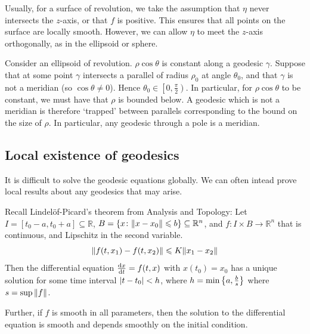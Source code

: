 \documentclass[a4paper]{article}
\begin{document}
\begin{example}
	Usually, for a surface of revolution, we take the assumption that \( \eta \) never intersects the \( z \)-axis, or that \( f \) is positive.
	This ensures that all points on the surface are locally smooth.
	However, we can allow \( \eta \) to meet the \( z \)-axis orthogonally, as in the ellipsoid or sphere.

	Consider an ellipsoid of revolution.
	\( \rho \cos \theta \) is constant along a geodesic \( \gamma \).
	Suppose that at some point \( \gamma \) intersects a parallel of radius \( \rho_0 \) at angle \( \theta_0 \), and that \( \gamma \) is not a meridian (so \( \cos \theta \neq 0 \)).
	Hence \( \theta_0 \in \left[0, \frac{\pi}{2}\right) \).
	In particular, for \( \rho \cos \theta \) to be constant, we must have that \( \rho \) is bounded below.
	A geodesic which is not a meridian is therefore `trapped' between parallels corresponding to the bound on the size of \( \rho \).
	In particular, any geodesic through a pole is a meridian.
\end{example}

\subsection{Local existence of geodesics}
It is difficult to solve the geodesic equations globally.
We can often intead prove local results about any geodesics that may arise.

Recall Lindel\"of-Picard's theorem from Analysis and Topology:
Let \( I = [t_0 - a, t_0 + a] \subseteq \mathbb R \), \( B = \qty{x \colon \norm{x-x_0} \leqslant b} \subseteq \mathbb R^n \), and \( f \colon I \times B \to \mathbb R^n \) that is continuous, and Lipschitz in the second variable.
\[
	\norm{f(t,x_1) - f(t,x_2)} \leqslant K \norm{x_1-x_2}
\]
Then the differential equation \( \dv{x}{t} = f(t,x) \) with \( x(t_0) = x_0 \) has a unique solution for some time interval \( \abs{t-t_0} < h \), where \( h = \min\qty{a,\frac{b}{s}} \) where \( s = \sup \norm{f} \).

Further, if \( f \) is smooth in all parameters, then the solution to the differential equation is smooth and depends smoothly on the initial condition.
\end{document}
